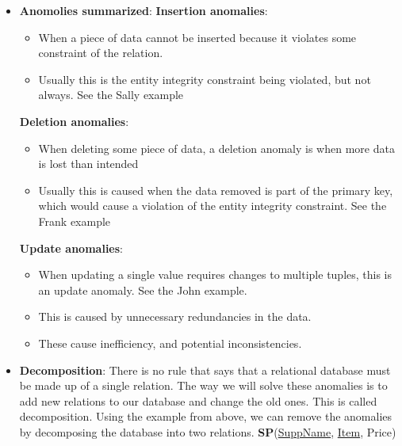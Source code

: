 \documentclass{report}
\begin{document}
\begin{itemize}
        \item \textbf{Anomolies summarized}:
            \bigbreak \noindent 
            \textbf{Insertion anomalies}:
            \begin{itemize}
                \item When a piece of data cannot be inserted because it violates some constraint of the relation.
                \item Usually this is the entity integrity constraint being violated, but not always. See the Sally example
            \end{itemize}
            \bigbreak \noindent 
            \textbf{Deletion anomalies}: 
            \begin{itemize}
                \item When deleting some piece of data, a deletion anomaly is when more data is lost than intended
                \item Usually this is caused when the data removed is part of the primary key, which would cause a violation of the entity integrity constraint. See the Frank example
            \end{itemize}
            \bigbreak \noindent 
            \textbf{Update anomalies}:
            \begin{itemize}
                \item When updating a single value requires changes to multiple tuples, this is an update anomaly. See the John example.
                \item This is caused by unnecessary redundancies in the data.
                \item These cause inefficiency, and potential inconsistencies.
            \end{itemize}
            \bigbreak \noindent 
        \item \textbf{Decomposition}: There is no rule that says that a relational database must be made up of a single relation. The way we will solve these anomalies is to add new relations to our database and change the old ones. This is called decomposition.
            \bigbreak \noindent 
            Using the example from above, we can remove the anomalies by decomposing the database into two relations.
            \bigbreak \noindent 
            \textbf{SP}(\underline{SuppName}, \underline{Item}, Price)
            \bigbreak \noindent 
            \begin{center}
                \begin{tabular}{|l|l|l|}
                    \hline

\end{tabular}
\end{center}
\end{itemize}
\end{document}

